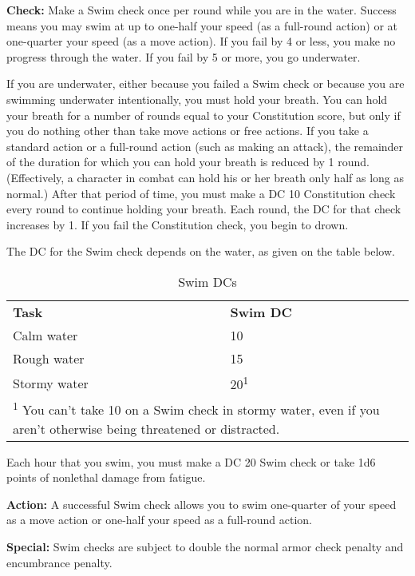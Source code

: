 
\textbf{Check:} Make a Swim check once per round while you are in the water. Success 
means you may swim at up to one-half your speed (as a full-round action) or at 
one-quarter your speed (as a move action). If you fail by 4 or less, you make no 
progress through the water. If you fail by 5 or more, you go underwater.

If you are underwater, either because you failed a Swim check or because you are 
swimming underwater intentionally, you must hold your breath. You can hold your 
breath for a number of rounds equal to your Constitution score, but only if you 
do nothing other than take move actions or free actions. If you take a standard 
action or a full-round action (such as making an attack), the remainder of the 
duration for which you can hold your breath is reduced by 1 round. (Effectively, 
a character in combat can hold his or her breath only half as long as normal.) 
After that period of time, you must make a DC 10 Constitution check every round 
to continue holding your breath. Each round, the DC for that check increases by 
1. If you fail the Constitution check, you begin to drown.

The DC for the Swim check depends on the water, as given on the table below.

\begin{table}[htb]
\caption{Swim DCs}
\centering
\begin{tabular}{l l}
\textbf{Task} & \textbf{Swim DC}\\
Calm water & 10\\
Rough water & 15\\
Stormy water & 20\textsuperscript{1}\\
\multicolumn{2}{p{6cm}}{\textsuperscript{1} You can't take 10 on a Swim check in stormy water, even if you aren't otherwise being threatened or distracted.}\\
\end{tabular}
\end{table}

Each hour that you swim, you must make a DC 20 Swim check or take 1d6 points of 
nonlethal damage from fatigue.

\textbf{Action:} A successful Swim check allows you to swim one-quarter of your 
speed as a move action or one-half your speed as a full-round action.

\textbf{Special:} Swim checks are subject to double the normal armor check penalty 
and encumbrance penalty.

